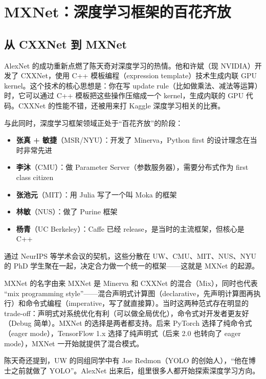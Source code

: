 \section{MXNet：深度学习框架的百花齐放}

\subsection{从 CXXNet 到 MXNet}

AlexNet 的成功重新点燃了陈天奇对深度学习的热情。他和许斌（现 NVIDIA）开发了 CXXNet，使用 C++ 模板编程（expression template）技术生成内联 GPU kernel。这个技术的核心思想是：你在写 update rule（比如做乘法、减法等运算）时，它可以通过 C++ 模板把这些操作压缩成一个 kernel，生成内联的 GPU 代码。CXXNet 的性能不错，还被用来打 Kaggle 深度学习相关的比赛。

与此同时，深度学习框架领域正处于``百花齐放''的阶段：

\begin{itemize}
    \item \textbf{张真 + 敏捷}（MSR/NYU）：开发了 Minerva，Python first 的设计理念在当时非常先进
    \item \textbf{李沐}（CMU）：做 Parameter Server（参数服务器），需要分布式作为 first class citizen
    \item \textbf{张池元}（MIT）：用 Julia 写了一个叫 Moka 的框架
    \item \textbf{林敏}（NUS）：做了 Purine 框架
    \item \textbf{杨青}（UC Berkeley）：Caffe 已经 release，是当时的主流框架，但核心是 C++
\end{itemize}

通过 NeurIPS 等学术会议的契机，这些分散在 UW、CMU、MIT、NUS、NYU 的 PhD 学生聚在一起，决定合力做一个统一的框架------这就是 MXNet 的起源。

\begin{knowledgebox}{MXNet 的名字由来}
MXNet 是 Minerva 和 CXXNet 的混合（Mix），同时也代表 ``mix programming style''------混合声明式计算图（declarative，先声明计算图再执行）和命令式编程（imperative，写了就直接算）。当时这两种范式存在明显的 trade-off：声明式对系统优化有利（可以做全局优化），命令式对开发者更友好（Debug 简单）。MXNet 的选择是两者都支持。后来 PyTorch 选择了纯命令式（eager mode），TensorFlow 1.x 选择了纯声明式（后来 2.0 也转向了 eager mode），MXNet 一开始就提供了混合模式。
\end{knowledgebox}

陈天奇还提到，UW 的同组同学中有 Joe Redmon（YOLO 的创始人），``他在博士之前就做了 YOLO''。AlexNet 出来后，组里很多人都开始探索深度学习方向。

